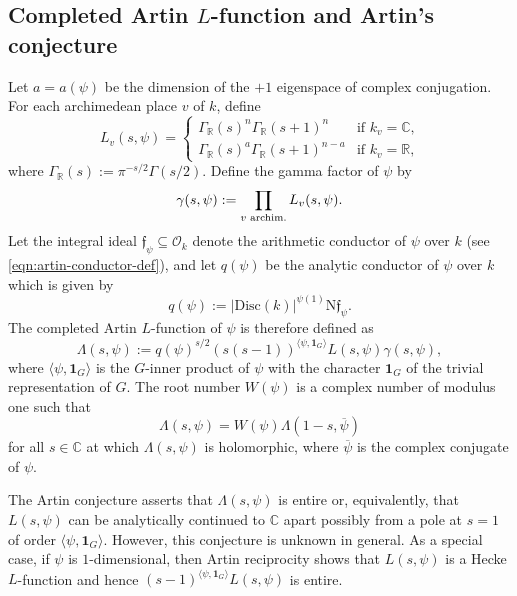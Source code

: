 \documentclass[12pt]{amsart}
\theoremstyle{definition} \newtheorem{definition}[theorem]{Definition}
\theoremstyle{example} \newtheorem{example}[theorem]{Example}
\theoremstyle{remark} \newtheorem{remark}{Remark}[theorem]
\numberwithin{equation}{section}
\numberwithin{theorem}{section}
\newcommand{\N}{\mathrm{N}} %
\newcommand{\R}{\mathbb{R}}
\newcommand{\kf}{\mathfrak{f}}
\newcommand{\Disc}{\mathrm{Disc}}
\begin{document}
\subsection{Completed Artin $L$-function and Artin's conjecture} 
Let $a = a(\psi)$ be the dimension of the $+1$ eigenspace of complex conjugation. For each archimedean place $v$ of $k$, define
\[
L_v(s,\psi) = \begin{cases}
	\Gamma_{\R}(s)^{n}\Gamma_{\R}(s+1)^n&\mbox{if $k_v=\mathbb{C}$,}\\
\Gamma_{\R}(s)^a \Gamma_{\R}(s+1)^{n-a}&\mbox{if $k_v=\R$,}
\end{cases}
\]
where $\Gamma_{\R}(s) := \pi^{-s/2}\Gamma(s/2)$. Define the gamma factor of $\psi$ by 
\[
\gamma(s,\psi) :=\prod_{\textup{$v$ archim.}}L_v(s,\psi).
\]
Let the integral ideal $\kf_{{\psi}}\subseteq\mathcal{O}_k$  denote the arithmetic conductor of ${\psi}$ over $k$ (see \eqref{eqn:artin-conductor-def}), and let $q(\psi)$ be the analytic conductor of $\psi$ over $k$ which is given by 
\begin{equation} \label{eqn:Artin-AnalyticConductor}
q(\psi) := |\Disc(k)|^{\psi(1)} \N\kf_{{\psi}}.	
\end{equation}
The completed Artin $L$-function of $\psi$ is therefore defined as
\begin{equation}
\label{eqn:Artin-Completed}
\Lambda(s,{\psi}):= q(\psi)^{s/2} (s(s-1))^{\langle \psi, \mathbf{1}_G\rangle} L(s,\psi)\gamma(s,\psi),
\end{equation}
where $\langle \psi, \mathbf{1}_G \rangle$ is the $G$-inner product of $\psi$ with the character $\mathbf{1}_G$ of the trivial representation of $G$. The root number $W(\psi)$ is a complex number of modulus one such that
\[
	\Lambda(s,\psi) = W(\psi) \Lambda(1-s,\overline{\psi})
\]
for all $s\in\mathbb{C}$ at which $\Lambda(s,\psi)$ is holomorphic, where $\overline{\psi}$ is the complex conjugate of $\psi$. 



The Artin conjecture asserts that $\Lambda(s,\psi)$ is entire or, equivalently, that  $L(s,\psi)$ can be analytically continued to  $\mathbb{C}$ apart possibly from a pole at $s=1$ of order $\langle \psi, \mathbf{1}_G \rangle$.  However, this conjecture is unknown in general. As a special case, if $\psi$ is $1$-dimensional, then Artin reciprocity shows that $L(s,\psi)$ is a Hecke $L$-function and hence   $(s-1)^{\langle \psi, \mathbf{1}_G\rangle} L(s,\psi)$  is entire.
\end{document}
